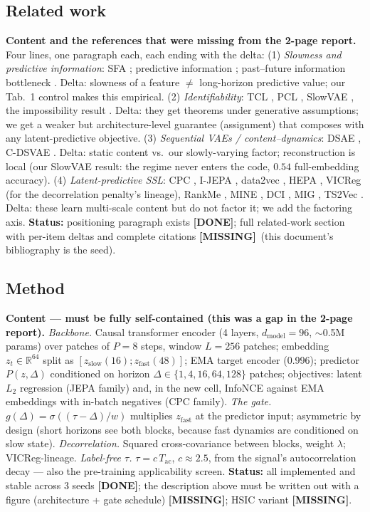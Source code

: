 \documentclass[10pt]{article}
\newcommand{\done}{\textcolor[rgb]{0,0.45,0}{\textbf{[DONE]}}}
\newcommand{\todo}{\textcolor[rgb]{0.75,0,0}{\textbf{[MISSING]}}}
\newcommand{\zslow}{z_{\mathrm{slow}}}
\newcommand{\zfast}{z_{\mathrm{fast}}}
\begin{document}
\subsection{Related work}
\textbf{Content and the references that were missing from the 2-page
report.} Four lines, one paragraph each, each ending with the delta:
(1) \emph{Slowness and predictive information}: SFA
\cite{wiskott2002slow}; predictive information \cite{bialek2001predictability};
past--future information bottleneck \cite{creutzig2009past}. Delta: slowness
of a feature $\neq$ long-horizon predictive value; our Tab.~1 control makes
this empirical.
(2) \emph{Identifiability}: TCL \cite{hyvarinen2016unsupervised}, PCL
\cite{hyvarinen2017nonlinear}, SlowVAE \cite{klindt2021towards}, the
impossibility result \cite{locatello2019challenging}. Delta: they get
theorems under generative assumptions; we get a weaker but
architecture-level guarantee (assignment) that composes with any
latent-predictive objective.
(3) \emph{Sequential VAEs / content--dynamics}: DSAE \cite{hsu2017unsupervised},
C-DSVAE \cite{bai2021contrastively}. Delta: static content vs.\ our
slowly-varying factor; reconstruction is local (our SlowVAE result: the
regime never enters the code, $0.54$ full-embedding accuracy).
(4) \emph{Latent-predictive SSL}: CPC \cite{oord2018representation}, I-JEPA
\cite{assran2023self}, data2vec \cite{baevski2022data2vec}, HEPA
\cite{hepa2026}, VICReg \cite{bardes2022vicreg} (for the decorrelation
penalty's lineage), RankMe \cite{garrido2023rankme}, MINE
\cite{belghazi2018mine}, DCI \cite{eastwood2018framework}, MIG
\cite{chen2018isolating}, TS2Vec \cite{yue2022ts2vec}.
Delta: these learn multi-scale content but do not factor it; we add the
factoring axis.
\textbf{Status:} positioning paragraph exists \done; full related-work
section with per-item deltas and complete citations \todo\ (this document's
bibliography is the seed).

\subsection{Method}
\textbf{Content --- must be fully self-contained (this was a gap in the
2-page report).}
\emph{Backbone.} Causal transformer encoder (4 layers, $d_{\mathrm{model}}
{=}96$, $\sim$0.5M params) over patches of $P{=}8$ steps, window $L{=}256$
patches; embedding $z_t\in\mathbb R^{64}$ split as
$[\zslow(16);\zfast(48)]$; EMA target encoder (0.996); predictor
$P(z,\Delta)$ conditioned on horizon $\Delta\in\{1,4,16,64,128\}$ patches;
objectives: latent $L_2$ regression (JEPA family) and, in the new cell,
InfoNCE against EMA embeddings with in-batch negatives (CPC family).
\emph{The gate.} $g(\Delta)=\sigma((\tau-\Delta)/w)$ multiplies $\zfast$ at
the predictor input; asymmetric by design (short horizons see both blocks,
because fast dynamics are conditioned on slow state).
\emph{Decorrelation.} Squared cross-covariance between blocks, weight
$\lambda$; VICReg-lineage.
\emph{Label-free $\tau$.} $\tau=c\,T_{\mathrm{ac}}$, $c\!\approx\!2.5$, from
the signal's autocorrelation decay --- also the pre-training applicability
screen.
\textbf{Status:} all implemented and stable across 3 seeds \done; the
description above must be written out with a figure (architecture + gate
schedule) \todo; HSIC variant \todo.
\end{document}
